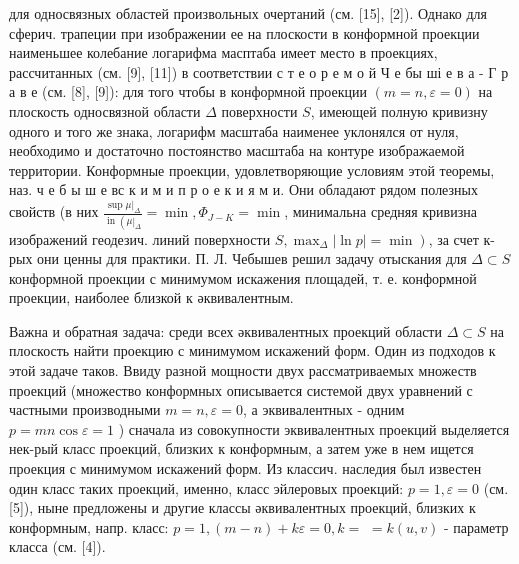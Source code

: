 \documentclass[10pt]{article}
\begin{document}
для односвязных областей произвольных очертаний (см. [15], [2]). Однако для сферич. трапеции при изображении ее на плоскости в конформной проекции наименьшее колебание логарифма масптаба имеет место в проекциях, рассчитанных (см. [9], [11]) в соответствии с т е о р е м о й Ч е бы ші е в а - Г р а в е (см. [8], [9]): для того чтобы в конформной проекции $(m=n, \varepsilon=0)$ на плоскость односвязной области $\Delta$ поверхности $S$, имеющей полную кривизну одного и того же знака, логарифм масштаба наименее уклонялся от нуля, необходимо и достаточно постоянство масштаба на контуре изображаемой территории. Конформные проекции, удовлетворяющие условиям этой теоремы, наз. ч е б ы ш е вс к и м и п р о е к и я м и. Они обладают рядом полезных свойств (в них $\frac{\left.\sup \mu\right|_{\Delta}}{\operatorname{in}\left(\left.\mu\right|_{\Delta}\right.}=\min , \Phi_{J-K}=\min$, минимальна средняя кривизна изображений геодезич. линий поверхности $\left.S, \max _{\Delta}|\ln p|=\min \right)$, за счет к-рых они ценны для практики. П. Л. Чебышев решил задачу отыскания для $\Delta \subset S$ конформной проекции с минимумом искажения площадей, т. е. конформной проекции, наиболее близкой к әквивалентным.



Важна и обратная задача: среди всех әквивалентных проекций области $\Delta \subset S$ на плоскость найти проекцию с минимумом искажений форм. Один из подходов к этой задаче таков. Ввиду разной мощности двух рассматриваемых множеств проекций (множество конформных описывается системой двух уравнений с частными производными $m=n, \varepsilon=0$, а эквивалентных - одним $p=m n \cos \varepsilon=1$ ) сначала из совокупности эквивалентных проекций выделяется нек-рый класс проекций, близких к конформным, а затем уже в нем ищется проекция с минимумом искажений форм. Из классич. наследия был известен один класс таких проекций, именно, класс эйлеровых проекций: $p=1, \varepsilon=0$ (см. [5]), ныне предложены и другие классы әквивалентных проекций, близких к конформным, напр. класс: $p=1,(m-n)+k \varepsilon=0, k=$ $=k(u, v)$ - параметр класса (см. [4]).
\end{document}
